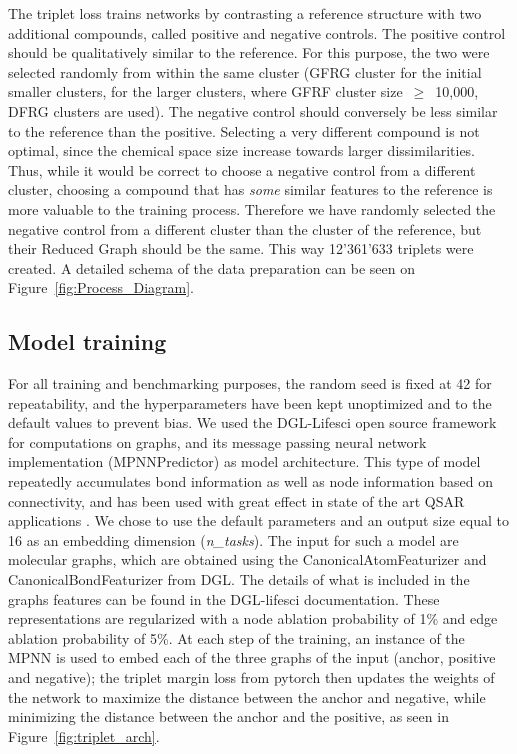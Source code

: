 \documentclass[doublespacing]{bmcart}
\begin{document}
The triplet loss trains networks by contrasting a reference structure with two additional compounds, called positive and negative controls. The positive control should be qualitatively similar to the reference. For this purpose, the two were selected randomly from within the same cluster (GFRG cluster for the initial smaller clusters, for the larger clusters, where GFRF cluster size~$\geq$~10,000, DFRG clusters are used). The negative control should conversely be less similar to the reference than the positive. Selecting a very different compound is not optimal, since the chemical space size increase towards larger dissimilarities. Thus, while it would be correct to choose a negative control from a different cluster, choosing a compound that has \textit{some} similar features to the reference is more valuable to the training process. Therefore we have randomly selected the negative control from a different cluster than the cluster of the reference, but their Reduced Graph should be the same. This way 12'361'633 triplets were created. A detailed schema of the data preparation can be seen on Figure~\ref{fig:Process_Diagram}.



\subsection*{Model training}
For all training and benchmarking purposes, the random seed is fixed at 42 for repeatability, and the hyperparameters have been kept unoptimized and to the default values to prevent bias. We used the DGL-Lifesci open source framework for computations on graphs, and its message passing neural network implementation (MPNNPredictor)\cite{gilmer2017neural} as model architecture. This type of model repeatedly accumulates bond information as well as node information based on connectivity, and has been used with great effect in state of the art QSAR applications \cite{yang2019analyzing}. We chose to use the default parameters and an output size equal to 16 as an embedding dimension (\textit{n\_tasks}). The input for such a model are molecular graphs, which are obtained using the CanonicalAtomFeaturizer and CanonicalBondFeaturizer from DGL. The details of what is included in the graphs features can be found in the DGL-lifesci documentation. These representations are regularized with a node ablation probability of 1\% and edge ablation probability of 5\%. At each step of the training, an instance of the MPNN is used to embed each of the three graphs of the input (anchor, positive and negative); the triplet margin loss from pytorch\cite{NEURIPS2019_9015} then updates the weights of the network to maximize the distance between the anchor and negative, while minimizing the distance between the anchor and the positive, as seen in Figure~\ref{fig:triplet_arch}.
\end{document}
